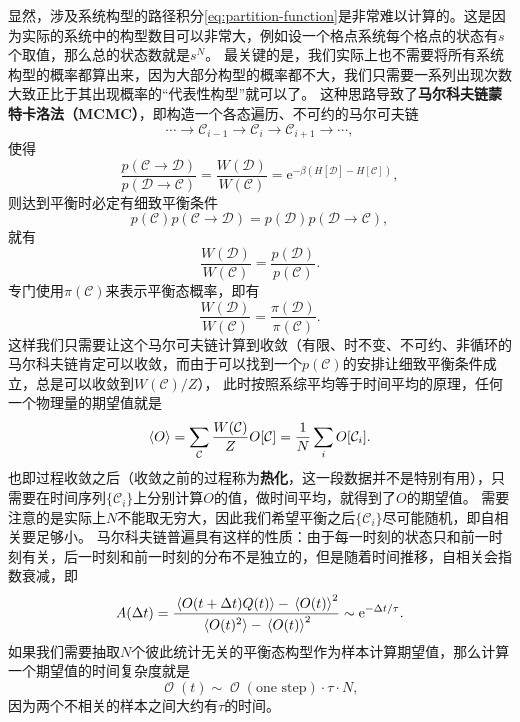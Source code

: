 \documentclass[hyperref, UTF8, a4paper]{ctexart}
\newcommand*{\ee}{\mathrm{e}}
\DeclareMathOperator{\bigO}{\mathcal{O}}
\newcommand*{\concept}[1]{{\textbf{#1}}}
\begin{document}
显然，涉及系统构型的路径积分\eqref{eq:partition-function}是非常难以计算的。这是因为实际的系统中的构型数目可以非常大，例如设一个格点系统每个格点的状态有$s$个取值，那么总的状态数就是$s^N$。
最关键的是，我们实际上也不需要将所有系统构型的概率都算出来，因为大部分构型的概率都不大，我们只需要一系列出现次数大致正比于其出现概率的“代表性构型”就可以了。
这种思路导致了\concept{马尔科夫链蒙特卡洛法（MCMC）}，即构造一个各态遍历、不可约的马尔可夫链
\[
    \cdots \longrightarrow \mathcal{C}_{i-1} \longrightarrow \mathcal{C}_i \longrightarrow \mathcal{C}_{i+1} \longrightarrow \cdots,
\]
使得
\begin{equation}
    \frac{p(\mathcal{C} \rightarrow \mathcal{D})}{p(\mathcal{D} \rightarrow \mathcal{C})} = \frac{W(\mathcal{D})}{W(\mathcal{C})} = \ee^{-\beta(H[\mathcal{D}]-H[\mathcal{C}])},
    \label{eq:markov-mcmc}
\end{equation}
则达到平衡时必定有细致平衡条件
\[
    p(\mathcal{C}) p(\mathcal{C} \rightarrow \mathcal{D}) = p(\mathcal{D}) p(\mathcal{D} \rightarrow \mathcal{C}),
\]
就有
\[
    \frac{W(\mathcal{D})}{W(\mathcal{C})} = \frac{p(\mathcal{D})}{p(\mathcal{C})}.
\]
专门使用$\pi(\mathcal{C})$来表示平衡态概率，即有
\begin{equation}
    \frac{W(\mathcal{D})}{W(\mathcal{C})} = \frac{\pi(\mathcal{D})}{\pi(\mathcal{C})}.
\end{equation}
这样我们只需要让这个马尔可夫链计算到收敛（有限、时不变、不可约、非循环的马尔科夫链肯定可以收敛，而由于可以找到一个$p(\mathcal{C})$的安排让细致平衡条件成立，总是可以收敛到$W(\mathcal{C})/Z$），
此时按照系综平均等于时间平均的原理，任何一个物理量的期望值就是
\begin{equation}
    \expval{O} = \sum_{\mathcal{C}} \frac{W(\mathcal{C})}{Z} O[\mathcal{C}] = \frac{1}{N} \sum_i O[\mathcal{C}_i].
    \label{eq:classical-expectation}
\end{equation}
也即过程收敛之后（收敛之前的过程称为\concept{热化}，这一段数据并不是特别有用），只需要在时间序列$\{\mathcal{C}_i\}$上分别计算$O$的值，做时间平均，就得到了$O$的期望值。
需要注意的是实际上$N$不能取无穷大，因此我们希望平衡之后$\{\mathcal{C}_i\}$尽可能随机，即自相关要足够小。
马尔科夫链普遍具有这样的性质：由于每一时刻的状态只和前一时刻有关，后一时刻和前一时刻的分布不是独立的，但是随着时间推移，自相关会指数衰减，即
\begin{equation}
    A(\Delta t) = \frac{\expval*{O(t+\Delta t) Q(t)} - \expval*{O(t)}^2}{\expval*{O(t)^2} - \expval*{O(t)}^2} \sim \ee^{- \Delta t / \tau}.
\end{equation}
如果我们需要抽取$N$个彼此统计无关的平衡态构型作为样本计算期望值，那么计算一个期望值的时间复杂度就是
\begin{equation}
    \bigO(t) \sim \bigO(\text{one step}) \cdot \tau \cdot N,
\end{equation}
因为两个不相关的样本之间大约有$\tau$的时间。
\end{document}

